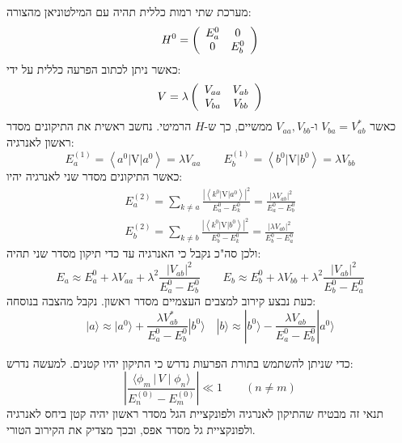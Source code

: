 \documentclass{tstextbook}
\begin{document}
\begin{example}
מערכת שתי רמות כללית תהיה עם המילטוניאן מהצורה:
$${H}^{0}=\left(\begin{array}{c c}{{E_{a}^{0}}}&{{0}}\\ {{0}}&{{E_{b}^{0}}}\end{array}\right)$$
כאשר ניתן לכתוב הפרעה כללית על ידי:
$${V}=\lambda\left(\begin{array}{c c}{{V_{a a}}}&{{V_{a b}}}\\ {{V_{b a}}}&{{V_{b b}}}\end{array}\right)$$
כאשר \(V_{ba}=V_{ab}^{*}\) ו-\(V_{aa},V_{bb}\) ממשיים, כך ש-\(H\) הרמיטי. נחשב ראשית את התיקונים מסדר ראשון לאנרגיה:
$$E_{a}^{(1)}=\left\langle  a^{0}|\mathrm{V}|a^{0} \right\rangle=\lambda V_{a a} \qquad E_{b}^{(1)}=\left\langle  b^{0}|\mathrm{V}|b^{0} \right\rangle=\lambda V_{b b}$$
כאשר התיקונים מסדר שני לאנרגיה יהיו:
\begin{gather*}E_{a}^{(2)}=\sum_{k\neq a}\frac{|\left\langle  k^{0}|\mathrm{V}|a^{0} \right\rangle|^{2}}{E_{a}^{0}-E_{k}^{0}}=\frac{|\lambda V_{a b}|^{2}}{E_{a}^{0}-E_{b}^{0}}\\ E_{b}^{(2)}=\sum_{k\neq b}\frac{|\left\langle  k^{0}|\mathrm{V}|b^{0} \right\rangle|^{2}}{E_{b}^{0}-E_{k}^{0}}=\frac{|\lambda V_{a b}|^{2}}{E_{b}^{0}-E_{a}^{0}}
\end{gather*}
ולכן סה"כ נקבל כי האנרגיה עד כדי תיקון מסדר שני תהיה:
$$E_{a}\approx E_{a}^{0}+\lambda V_{a a}+\lambda^{2}\frac{|V_{a b}|^{2}}{E_{a}^{0}-E_{b}^{0}}\qquad E_{b}\approx E_{b}^{0}+\lambda V_{b b}+\lambda^{2}\frac{|V_{a b}|^{2}}{E_{b}^{0}-E_{a}^{0}}$$
כעת נבצע קירוב למצבים העצמיים מסדר ראשון. נקבל מהצבה בנוסחה:
$$|a\rangle\approx|a^{0}\rangle+\frac{\lambda V_{a b}^{*}}{E_{a}^{0}-E_{b}^{0}}|b^{0}\rangle  \quad |b\rangle\approx|b^{0}\rangle-\frac{\lambda V_{a b}}{E_{a}^{0}-E_{b}^{0}}|a^{0}\rangle$$

\end{example}
\begin{proposition}
כדי שניתן להשתמש בתורת הפרעות נדרש כי התיקון יהיו קטנים. למעשה נדרש:
$$\left|\frac{\langle\phi_{m}\,|\,V\mid\phi_{n}\rangle}{E_{n}^{(0)}-E_{m}^{(0)}}\right|\ll1\qquad(n\neq m)$$
תנאי זה מבטיח שהתיקון לאנרגיה ולפונקציית הגל מסדר ראשון יהיה קטן ביחס לאנרגיה ולפונקציית גל מסדר אפס, ובכך מצדיק את הקירוב הטורי.

\end{proposition}
\end{document}
